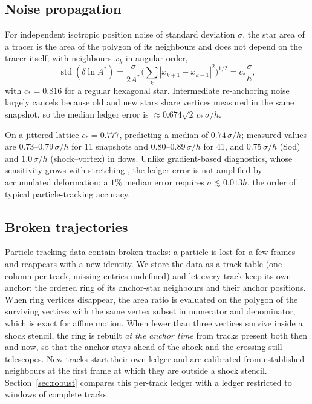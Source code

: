 \documentclass[11pt]{article}
\theoremstyle{definition}\newtheorem{definition}{Definition}\theoremstyle{remark}\newtheorem{remark}{Remark}
\begin{document}
\subsection{Noise propagation}
\begin{proposition}\label{prop:noise}
For independent isotropic position noise of standard deviation $\sigma$, the star area of a tracer is the area of the polygon of its neighbours and does not depend on the tracer itself; with neighbours $x_k$ in angular order,
\begin{equation}
\operatorname{std}(\delta\ln A^\ast)=\frac{\sigma}{2A^\ast}\Big(\sum_k|x_{k+1}-x_{k-1}|^2\Big)^{1/2}=c_\ast\frac{\sigma}{h},
\end{equation}
with $c_\ast=0.816$ for a regular hexagonal star. Intermediate re-anchoring noise largely cancels because old and new stars share vertices measured in the same snapshot, so the median ledger error is $\approx0.674\sqrt2\,c_\ast\,\sigma/h$.
\end{proposition}
On a jittered lattice $c_\ast=0.777$, predicting a median of $0.74\,\sigma/h$; measured values are $0.73$--$0.79\,\sigma/h$ for 11 snapshots and $0.80$--$0.89\,\sigma/h$ for 41, and $0.75\,\sigma/h$ (Sod) and $1.0\,\sigma/h$ (shock--vortex) in flows. Unlike gradient-based diagnostics, whose sensitivity grows with stretching \citep{Badza2023,Balasuriya2020}, the ledger error is not amplified by accumulated deformation; a $1\%$ median error requires $\sigma\lesssim0.013h$, the order of typical particle-tracking accuracy.

\subsection{Broken trajectories}
Particle-tracking data contain broken tracks: a particle is lost for a few frames and reappears with a new identity. We store the data as a track table (one column per track, missing entries undefined) and let every track keep its own anchor: the ordered ring of its anchor-star neighbours and their anchor positions. When ring vertices disappear, the area ratio is evaluated on the polygon of the surviving vertices with the same vertex subset in numerator and denominator, which is exact for affine motion. When fewer than three vertices survive inside a shock stencil, the ring is rebuilt \emph{at the anchor time} from tracks present both then and now, so that the anchor stays ahead of the shock and the crossing still telescopes. New tracks start their own ledger and are calibrated from established neighbours at the first frame at which they are outside a shock stencil. Section~\ref{sec:robust} compares this per-track ledger with a ledger restricted to windows of complete tracks.
\end{document}
